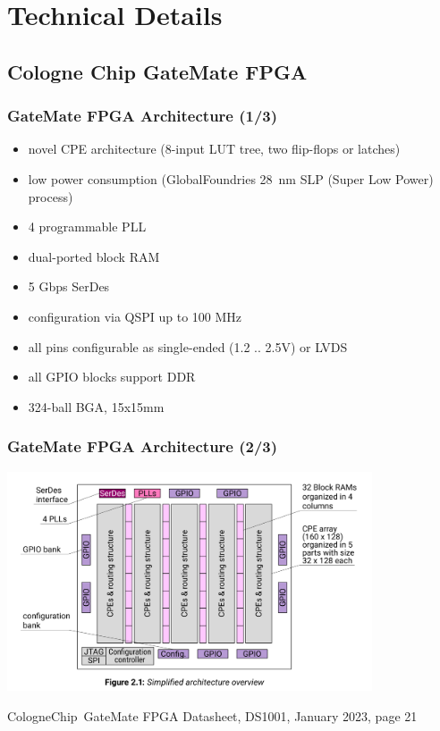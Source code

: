 \section{Technical Details}

\subsection{Cologne Chip GateMate FPGA}

\begin{frame}
  \frametitle{GateMate FPGA Architecture (1/3)}
  \begin{itemize}
  \item novel CPE architecture (8-input LUT tree, two flip-flops or latches)
  \item low power consumption (GlobalFoundries 28~nm SLP (Super Low
  Power) process)
  \item 4 programmable PLL
  \item dual-ported block RAM
  \item 5 Gbps SerDes
  \item configuration via QSPI up to 100 MHz
  \item all pins configurable as single-ended (1.2 .. 2.5V) or LVDS
  \item all GPIO blocks support DDR
  \item 324-ball BGA, 15x15mm
  \end{itemize}
\end{frame}

\begin{frame}
  \frametitle{GateMate FPGA Architecture (2/3)}

  \begin{center}
    \includegraphics[height=6.5cm]{Figure_2.1.png}
  \end{center}
  \vspace{-2.5cm}
  \begin{flushright}
  \begin{minipage}{3.7cm}
  \footnotesize{{CologneChip~GateMate} FPGA Datasheet, DS1001, January 2023, page 21}
  \end{minipage}
  \end{flushright}
\end{frame}

